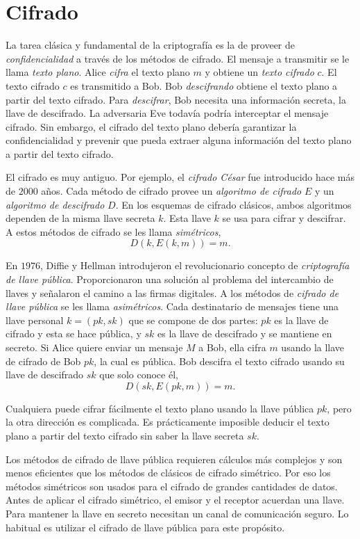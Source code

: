 \documentclass[12pt]{book}
\theoremstyle{definition}
\begin{document}
\section{Cifrado}

La tarea clásica y fundamental de la criptografía es la de proveer de \textit{confidencialidad} a través de los métodos de cifrado. El mensaje a transmitir se le llama \textit{texto plano}. Alice \textit{cifra} el texto plano $m$ y obtiene un \textit{texto cifrado} $c$. El texto cifrado $c$ es transmitido a Bob. Bob \textit{descifrando} obtiene el texto plano a partir del texto cifrado. Para \textit{descifrar}, Bob necesita una información secreta, la llave de descifrado. La adversaria Eve todavía podría interceptar el mensaje cifrado. Sin embargo, el cifrado del texto plano debería garantizar la confidencialidad y prevenir que pueda extraer alguna información del texto plano a partir del texto cifrado.

El cifrado es muy antiguo. Por ejemplo, el \textit{cifrado César} fue introducido hace más de $2000$ años. Cada método de cifrado provee un \textit{algoritmo de cifrado} $E$ y un \textit{algoritmo de descifrado} $D$. En los esquemas de cifrado clásicos, ambos algoritmos dependen de la misma llave secreta $k$. Esta llave $k$ se usa para cifrar y descifrar. A estos métodos de cifrado se les llama \textit{simétricos},
$$D(k,E(k,m))=m.$$

En $1976$, Diffie y Hellman introdujeron el revolucionario concepto de \textit{criptografía de llave pública}. Proporcionaron una solución al problema del intercambio de llaves y señalaron el camino a las firmas digitales. A los métodos de \textit{cifrado de llave pública} se les llama \textit{asimétricos}. Cada destinatario de mensajes tiene una llave personal $k = (pk,sk)$ que se compone de dos partes: $pk$ es la llave de cifrado y esta se hace pública, y $sk$ es la llave de descifrado y se mantiene en secreto. Si Alice quiere enviar un mensaje $M$ a Bob, ella cifra $m$ usando la llave de cifrado de Bob $pk$, la cual es pública. Bob descifra el texto cifrado usando su llave de descifrado $sk$ que solo conoce él,
$$D(sk,E(pk,m))=m.$$

Cualquiera puede cifrar fácilmente el texto plano usando la llave pública $pk$, pero la otra dirección es complicada. Es prácticamente imposible deducir el texto plano a partir del texto cifrado sin saber la llave secreta $sk$.

Los métodos de cifrado de llave pública requieren cálculos más complejos y son menos eficientes que los métodos de clásicos de cifrado simétrico. Por eso los métodos simétricos son usados para el cifrado de grandes cantidades de datos. Antes de aplicar el cifrado simétrico, el emisor y el receptor acuerdan una llave. Para mantener la llave en secreto necesitan un canal de comunicación seguro. Lo habitual es utilizar el cifrado de llave pública para este propósito.
\end{document}

